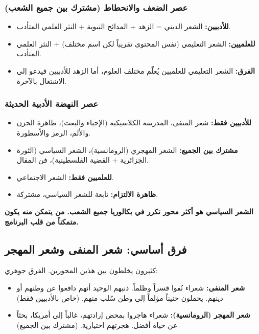 \documentclass[12pt,a4paper]{book}
\newcommand{\importantAr}[1]{%
	\begin{important}
		\bfseries #1
	\end{important}
}
\begin{document}
	\subsubsection*{عصر الضعف والانحطاط (مشترك بين جميع الشعب)}
	
	\begin{itemize}
		\item \textbf{للأدبيين:} الشعر الديني = الزهد + المدائح النبوية + النثر العلمي المتأدب.
		\item \textbf{للعلميين:} الشعر التعليمي (نفس المحتوى تقريباً لكن اسم مختلف) + النثر العلمي المتأدب.
		\item \textbf{الفرق:} الشعر التعليمي للعلميين يُعلّم مختلف العلوم، أما الزهد للأدبيين فيدعو إلى الاشتغال بالآخرة.
	\end{itemize}
	
	\subsubsection*{عصر النهضة الأدبية الحديثة}
	
	\begin{itemize}
		\item \textbf{للأدبيين فقط:} شعر المنفى، المدرسة الكلاسيكية (الإحياء والبعث)، ظاهرة الحزن والألم، الرمز والأسطورة.
		\item \textbf{مشترك بين الجميع:} الشعر المهجري (الرومانسية)، الشعر السياسي (الثورة الجزائرية + القضية الفلسطينية)، فن المقال.
		\item \textbf{للعلميين فقط:} الشعر الاجتماعي.
		\item \textbf{ظاهرة الالتزام:} تابعة للشعر السياسي، مشتركة.
	\end{itemize}
	
	\importantAr{الشعر السياسي هو أكثر محور تكرر في بكالوريا جميع الشعب. من يتمكن منه يكون متمكناً من قلب البرنامج.}
	
	\subsection{فرق أساسي: شعر المنفى وشعر المهجر}
	
	كثيرون يخلطون بين هذين المحورين. الفرق جوهري:
	
	\begin{itemize}
		\item \textbf{شعر المنفى:} شعراء نُفوا قسراً وظلماً. ذنبهم الوحيد أنهم دافعوا عن وطنهم أو دينهم. يحملون حنيناً مؤلماً إلى وطن سُلب منهم. (خاص بالأدبيين فقط)
		\item \textbf{شعر المهجر (الرومانسية):} شعراء هاجروا بمحض إرادتهم، غالباً إلى أمريكا، بحثاً عن حياة أفضل. هجرتهم اختيارية. (مشترك بين الجميع)
	\end{itemize}
	
\end{document}
